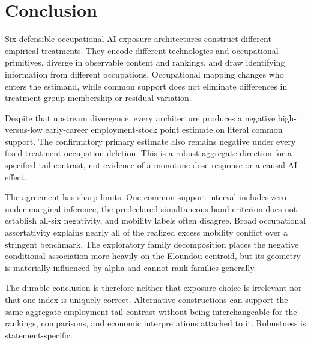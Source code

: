\section{Conclusion}\label{sec:conclusion}

Six defensible occupational AI-exposure architectures construct different empirical treatments. They encode different technologies and occupational primitives, diverge in observable content and rankings, and draw identifying information from different occupations. Occupational mapping changes who enters the estimand, while common support does not eliminate differences in treatment-group membership or residual variation.

Despite that upstream divergence, every architecture produces a negative high-versus-low early-career employment-stock point estimate on literal common support. The confirmatory primary estimate also remains negative under every fixed-treatment occupation deletion. This is a robust aggregate direction for a specified tail contrast, not evidence of a monotone dose-response or a causal AI effect.

The agreement has sharp limits. One common-support interval includes zero under marginal inference, the predeclared simultaneous-band criterion does not establish all-six negativity, and mobility labels often disagree. Broad occupational assortativity explains nearly all of the realized excess mobility conflict over a stringent benchmark. The exploratory family decomposition places the negative conditional association more heavily on the Eloundou centroid, but its geometry is materially influenced by alpha and cannot rank families generally.

The durable conclusion is therefore neither that exposure choice is irrelevant nor that one index is uniquely correct. Alternative constructions can support the same aggregate employment tail contrast without being interchangeable for the rankings, comparisons, and economic interpretations attached to it. Robustness is statement-specific.

